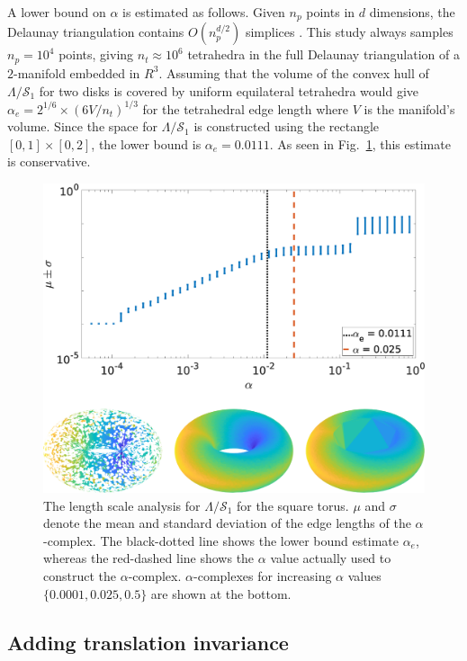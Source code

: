 \documentclass[default,iicol]{sn-jnl}%
\theoremstyle{thmstyleone}%
\theoremstyle{thmstyletwo}%
\theoremstyle{thmstylethree}%
\begin{document}
A lower bound on $\alpha$ is estimated as follows. Given $n_p$ points in $d$ dimensions, the Delaunay triangulation contains $O(n_p^{d/2})$ simplices \cite{seidel1995upper}. This study always samples $n_p = 10^4$ points, giving $n_t \approx 10^6$ tetrahedra in the full Delaunay triangulation of a $2$-manifold embedded in $R^3$. Assuming that the volume of the convex hull of $\Lambda/\mathcal{S}_1$ for two disks is covered by uniform equilateral tetrahedra would give $\alpha_e = 2^{1/6} \times (6V/n_t)^{1/3}$ for the tetrahedral edge length where $V$ is the manifold's volume. Since the space for $\Lambda/\mathcal{S}_1$ is constructed using the rectangle $[0, 1] \times [0, 2]$, the lower bound is $\alpha_e = 0.0111$. As seen in Fig.\ \ref{fig:figure7}, this estimate is conservative.

\begin{figure}
	\centering
	\includegraphics[width=0.9\columnwidth]{figure7.eps}
	\caption{The length scale analysis for $\Lambda/\mathcal{S}_1$ for the square torus. $\mu$ and $\sigma$ denote the mean and standard deviation of the edge lengths of the $\alpha$-complex. The black-dotted line shows the lower bound estimate $\alpha_e$, whereas the red-dashed line shows the $\alpha$ value actually used to construct the $\alpha$-complex. $\alpha$-complexes for increasing $\alpha$ values $\{0.0001, 0.025, 0.5\}$ are shown at the bottom.}
	\label{fig:figure7}
\end{figure}


\subsection{Adding translation invariance}
\label{subsec:space_translation}
\end{document}
